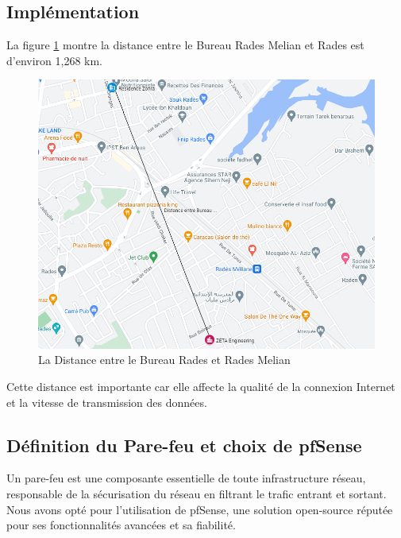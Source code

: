 \subsection{Implémentation}




La figure \ref{Chap2.4.21} montre la distance entre le Bureau Rades Melian et Rades est d'environ 1,268 km.  \\ 


\begin{figure}[H]
 \centering
    \includegraphics[width=15cm]{Images/distance1.png}
    \caption{La Distance entre le Bureau Rades et Rades Melian}
    \label{Chap2.4.21}
\end{figure}    
\smallskip


Cette distance est importante car elle affecte la qualité de la connexion Internet et la vitesse de transmission des données.  \\


\subsection{Définition du Pare-feu et choix de pfSense}

Un pare-feu est une composante essentielle de toute infrastructure réseau, responsable de la sécurisation du réseau en filtrant le trafic entrant et sortant. Nous avons opté pour l'utilisation de pfSense, une solution open-source réputée pour ses fonctionnalités avancées et sa fiabilité. \\

